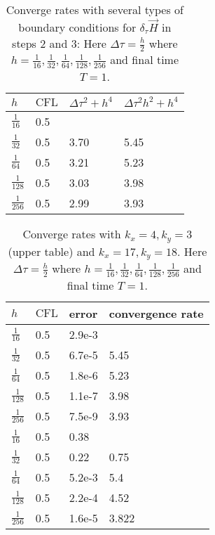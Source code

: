 \documentclass[12pt,reqno]{amsart}
\theoremstyle{definition}
\numberwithin{equation}{section}
\begin{document}
		
		\begin{table} [h!]
			\centering
			\begin{tabular}{|p{0.7cm}|p{0.7cm}|p{2cm}|p{2cm}|}
				\hline
				$h$ & $\mathrm{CFL}$ &$\Delta \tau^2+h^4$&$\Delta \tau^2h^2+h^4$
				\\ [0.5ex] 
				\hline 
				$\frac{1}{16}$ & 0.5& &  \\[0.5mm]
				$\frac{1}{32}$ & 0.5 &3.70 &5.45\\[0.5mm]
				$\frac{1}{64}$ & 0.5 & 3.21 &5.23 \\[0.5mm]
				$\frac{1}{128}$ & 0.5 &3.03 & 3.98\\[0.5mm]
				$\frac{1}{256}$ & 0.5& 2.99 &3.93 \\[0.5mm]
				\hline 
			\end{tabular}
			\caption{ Converge rates with several types of boundary conditions for $\delta_\tau \vec{H}$ in steps 2 and 3:	 
				Here $\Delta \tau=\frac{h}{2}$ where $h=\frac{1}{16},\frac{1}{32},\frac{1}{64},
				\frac{1}{128}, \frac{1}{256}
				$
				and final time $T=1$.}
			\label{table:conv_rates}
			
			
		\end{table}
		\begin{table} [h!]
			\centering
			\begin{tabular}{|p{0.7cm}|p{0.7cm}|p{2cm}| |p{4cm}|}
				\hline
				$h$ & $\mathrm{CFL}$ &error& convergence rate
				\\ [0.5ex] 
				\hline 
				$\frac{1}{16}$ & 0.5& 2.9e-3&  \\[0.5mm]
				$\frac{1}{32}$ & 0.5 &6.7e-5 &5.45\\[0.5mm]
				$\frac{1}{64}$ & 0.5 & 1.8e-6 &5.23 \\[0.5mm]
				$\frac{1}{128}$ & 0.5 &1.1e-7 & 3.98\\[0.5mm]
				$\frac{1}{256}$ & 0.5& 7.5e-9 &3.93 \\[0.5mm]
				\hline \hline
				$\frac{1}{16}$ & 0.5& 0.38&  \\[0.5mm]
				$\frac{1}{32}$ & 0.5 &0.22 &0.75\\[0.5mm]
				$\frac{1}{64}$ & 0.5 & 5.2e-3 &5.4 \\[0.5mm]
				$\frac{1}{128}$ & 0.5 &2.2e-4 & 4.52\\[0.5mm]
				$\frac{1}{256}$ & 0.5& 1.6e-5 &3.822 \\[0.5mm]
				\hline
			\end{tabular}
			\caption{ Converge rates with $k_x=4,k_y=3$ (upper table)
				and  $k_x=17,k_y=18$.
				Here $\Delta \tau=\frac{h}{2}$ where $h=\frac{1}{16},\frac{1}{32},\frac{1}{64},
				\frac{1}{128}, \frac{1}{256}
				$
				and final time $T=1$.}
			\label{table:conv_rates_2}
			
			
		\end{table}
\end{document}
